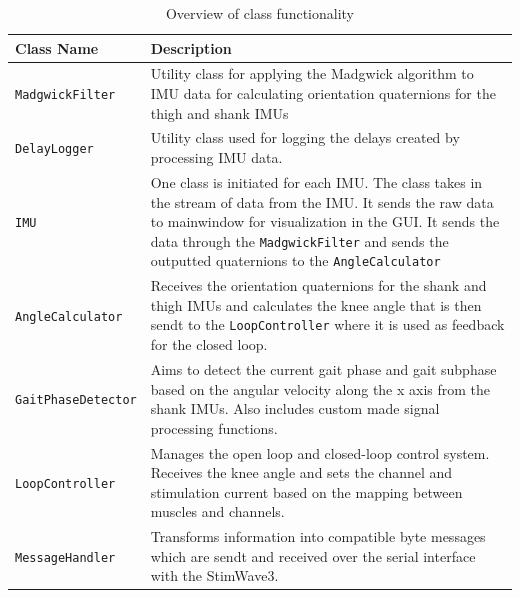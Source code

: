 \begin{table}[H]
\centering
\renewcommand{\arraystretch}{1.3} %
\begin{tcolorbox}[
    colback=white,      %
    colframe=black,     %
    arc=3mm,            %
    boxrule=0.5mm,      %
    width=\textwidth,   %
    halign=center       %
]
\begin{tabular}{p{} | p{}} %
\textbf{Class Name} & \textbf{Description} \\ \hline
\texttt{MadgwickFilter} & Utility class for applying the Madgwick algorithm to IMU data for calculating orientation quaternions for the thigh and shank IMUs \\

\texttt{DelayLogger} & Utility class used for logging the delays created by processing IMU data. \\

\texttt{IMU} & One class is initiated for each IMU. The class takes in the stream of data from the IMU. It sends the raw data to mainwindow for visualization in the GUI. It sends the data through the \texttt{MadgwickFilter} and sends the outputted quaternions to the \texttt{AngleCalculator} \\

\texttt{AngleCalculator} & Receives the orientation quaternions for the shank and thigh IMUs and calculates the knee angle that is then sendt to the \texttt{LoopController} where it is used as feedback for the closed loop.\\

\texttt{GaitPhaseDetector} & Aims to detect the current gait phase and gait subphase based on the angular velocity along the x axis from the shank IMUs. Also includes custom made signal processing functions.  \\

\texttt{LoopController} & Manages the open loop and closed-loop control system. Receives the knee angle and sets the channel and stimulation current based on the mapping between muscles and channels. \\

\texttt{MessageHandler} & Transforms information into compatible byte messages which are sendt and received over the serial interface with the StimWave3. \\
\end{tabular}
\end{tcolorbox}
\caption{Overview of class functionality}
\label{tab:class-overview}
\end{table}

